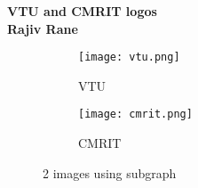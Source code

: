 \documentclass{article}
\begin{document}
\centering
\textbf{VTU and CMRIT logos}\\
\textbf{Rajiv Rane}\\

\begin{figure}[h]

\begin{subfigure}{0.6\textwidth}
    \texttt{[image: vtu.png]}
    \caption{VTU}
    \label{fig:subim1}
\end{subfigure}
\begin{subfigure}{0.6\textwidth}
    \texttt{[image: cmrit.png]}
    \caption{CMRIT}
    \label{fig:subim2}
\end{subfigure}
\caption{2 images using subgraph}
\label{fig:image2}
\end{figure}
\end{document}
